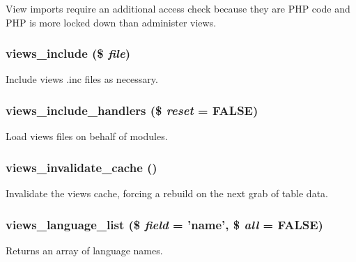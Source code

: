 View imports require an additional access check because they are PHP code and PHP is more locked down than administer views. \hypertarget{views_8module_ad842e97fb86ddbcdb0c35b42bae9abba}{
\subsubsection[{views\_\-include}]{\setlength{\rightskip}{0pt plus 5cm}views\_\-include (\$ {\em file})}}
\label{views_8module_ad842e97fb86ddbcdb0c35b42bae9abba}
Include views .inc files as necessary. \hypertarget{views_8module_a3369e9cb08a242a97093d79ed688653c}{
\subsubsection[{views\_\-include\_\-handlers}]{\setlength{\rightskip}{0pt plus 5cm}views\_\-include\_\-handlers (\$ {\em reset} = {\ttfamily FALSE})}}
\label{views_8module_a3369e9cb08a242a97093d79ed688653c}
Load views files on behalf of modules. \hypertarget{views_8module_a51e180fd9efb14998bb83aa5c9118867}{
\subsubsection[{views\_\-invalidate\_\-cache}]{\setlength{\rightskip}{0pt plus 5cm}views\_\-invalidate\_\-cache ()}}
\label{views_8module_a51e180fd9efb14998bb83aa5c9118867}
Invalidate the views cache, forcing a rebuild on the next grab of table data. \hypertarget{views_8module_a1e6f0f91344d0781f385e90f247e5aa8}{
\subsubsection[{views\_\-language\_\-list}]{\setlength{\rightskip}{0pt plus 5cm}views\_\-language\_\-list (\$ {\em field} = {\ttfamily 'name'}, \/  \$ {\em all} = {\ttfamily FALSE})}}
\label{views_8module_a1e6f0f91344d0781f385e90f247e5aa8}
Returns an array of language names.

